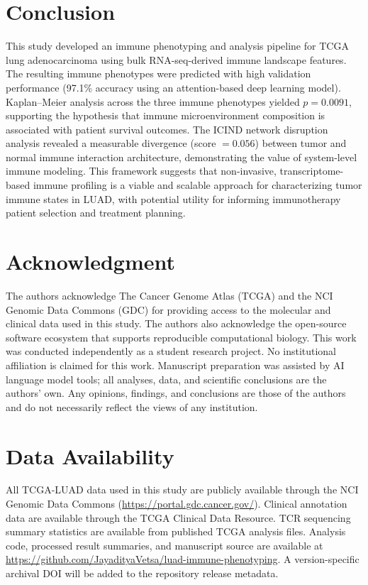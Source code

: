 \documentclass[conference]{IEEEtran}
\begin{document}
\section{Conclusion}
This study developed an immune phenotyping and analysis pipeline for TCGA lung adenocarcinoma using bulk RNA-seq-derived immune landscape features. The resulting immune phenotypes were predicted with high validation performance (97.1\% accuracy using an attention-based deep learning model). Kaplan--Meier analysis across the three immune phenotypes yielded $p=0.0091$, supporting the hypothesis that immune microenvironment composition is associated with patient survival outcomes. The ICIND network disruption analysis revealed a measurable divergence (score $=0.056$) between tumor and normal immune interaction architecture, demonstrating the value of system-level immune modeling. This framework suggests that non-invasive, transcriptome-based immune profiling is a viable and scalable approach for characterizing tumor immune states in LUAD, with potential utility for informing immunotherapy patient selection and treatment planning.

\section*{Acknowledgment}
The authors acknowledge The Cancer Genome Atlas (TCGA) and the NCI Genomic Data Commons (GDC) for providing access to the molecular and clinical data used in this study. The authors also acknowledge the open-source software ecosystem that supports reproducible computational biology. This work was conducted independently as a student research project. No institutional affiliation is claimed for this work. Manuscript preparation was assisted by AI language model tools; all analyses, data, and scientific conclusions are the authors' own. Any opinions, findings, and conclusions are those of the authors and do not necessarily reflect the views of any institution.


\section*{Data Availability}
All TCGA-LUAD data used in this study are publicly available through the NCI Genomic Data Commons (\url{https://portal.gdc.cancer.gov/}). Clinical annotation data are available through the TCGA Clinical Data Resource. TCR sequencing summary statistics are available from published TCGA analysis files. Analysis code, processed result summaries, and manuscript source are available at \url{https://github.com/JayadityaVetsa/luad-immune-phenotyping}. A version-specific archival DOI will be added to the repository release metadata.



\end{document}
